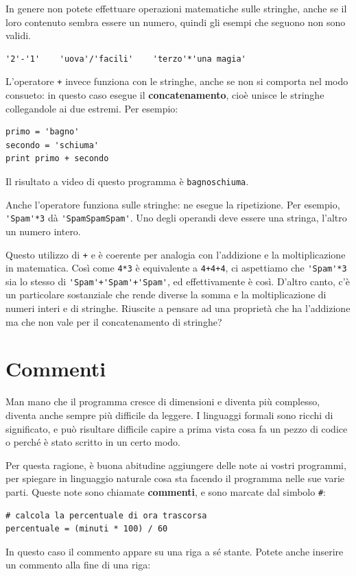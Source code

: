 \documentclass[10pt]{book}
\begin{document}
In genere non potete effettuare operazioni matematiche sulle stringhe, anche se il loro contenuto sembra essere un numero, quindi gli esempi che seguono non sono validi.

\begin{verbatim}
'2'-'1'    'uova'/'facili'    'terzo'*'una magia'
\end{verbatim}
%
L'operatore {\tt +} invece funziona con le stringhe, anche se non si comporta nel modo consueto: in questo caso esegue il {\bf concatenamento}, cioè unisce le stringhe collegandole ai due estremi. Per esempio:

\begin{verbatim}
primo = 'bagno'
secondo = 'schiuma'
print primo + secondo
\end{verbatim}
%
Il risultato a video di questo programma è {\tt bagnoschiuma}.

Anche l'operatore {\tt *} funziona sulle stringhe: ne esegue la ripetizione. Per esempio, \verb"'Spam'*3" dà \verb"'SpamSpamSpam'". Uno degli operandi deve essere una stringa, l'altro un numero intero.

Questo utilizzo di {\tt +} e {\tt *} è coerente per analogia con l'addizione e la moltiplicazione in matematica. Così come {\tt 4*3} è equivalente a {\tt 4+4+4}, ci aspettiamo che \verb"'Spam'*3" sia lo stesso di
\verb"'Spam'+'Spam'+'Spam'", ed effettivamente è così. D'altro canto, c'è un particolare sostanziale che rende diverse la somma e la moltiplicazione di numeri interi e di stringhe. Riuscite a pensare ad una proprietà che ha l'addizione ma che non vale per il concatenamento di stringhe?


\section{Commenti}

Man mano che il programma cresce di dimensioni e diventa più complesso, diventa anche sempre più difficile da leggere. I linguaggi formali sono ricchi di significato, e può risultare difficile capire a prima vista cosa fa un pezzo di codice o perché è stato scritto in un certo modo.

Per questa ragione, è buona abitudine aggiungere delle note ai vostri   programmi, per spiegare in linguaggio naturale cosa sta facendo il programma nelle sue varie parti. Queste note sono chiamate {\bf commenti}, e sono marcate dal simbolo \verb"#":

\begin{verbatim}
# calcola la percentuale di ora trascorsa
percentuale = (minuti * 100) / 60
\end{verbatim}
%
In questo caso il commento appare su una riga a sé stante. Potete anche inserire un commento alla fine di una riga:
\end{document}
